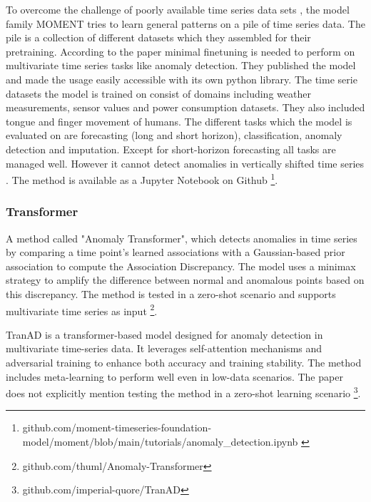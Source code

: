 To overcome the challenge of poorly available time series data sets \cite{ma_survey_2023}, the model family MOMENT tries to learn general patterns on a pile of time series data. The pile is a collection of different datasets which they assembled for their pretraining. According to the paper minimal finetuning is needed to perform on multivariate time series tasks like anomaly detection. They published the model and made the usage easily accessible with its own python library. The time serie datasets the model is trained on consist of domains including weather measurements, sensor values and power consumption datasets. They also included tongue and finger movement of humans. The different tasks which the model is evaluated on are forecasting (long and short horizon), classification, anomaly detection and imputation. Except for short-horizon forecasting all tasks are managed well. However it cannot detect anomalies in vertically shifted time series \cite{goswami_moment_2024}. The method is available as a Jupyter Notebook on Github \footnote{\fussy\tiny github.com/moment-timeseries-foundation-model/moment/blob/main/tutorials/anomaly\_detection.ipynb \label{foot_moment}}.


\subsubsection{Transformer}

A method called "Anomaly Transformer", which detects anomalies in time series by comparing a time point’s learned associations with a Gaussian-based prior association to compute the Association Discrepancy. The model uses a minimax strategy to amplify the difference between normal and anomalous points based on this discrepancy. The method is tested in a zero-shot scenario and supports multivariate time series as input \cite{xu_anomaly_2022} \footnote{\fussy\tiny github.com/thuml/Anomaly-Transformer}.

TranAD is a transformer-based model designed for anomaly detection in multivariate time-series data. It leverages self-attention mechanisms and adversarial training to enhance both accuracy and training stability. The method includes meta-learning to perform well even in low-data scenarios. The paper does not explicitly mention testing the method in a zero-shot learning scenario \cite{tuli_tranad_2022} \footnote{\fussy\tiny github.com/imperial-quore/TranAD}.

